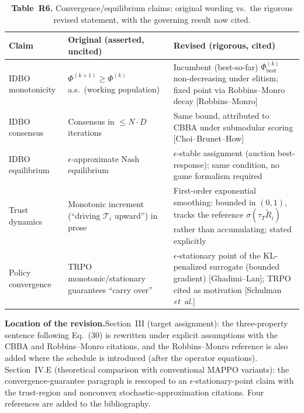 \documentclass[11pt]{article}
\newcommand{\loc}{\medskip\noindent\textbf{Location of the revision.}\quad}
\begin{document}
\begin{table}[h]
\centering
\caption*{\small\textbf{Table~R6.} Convergence/equilibrium claims: original wording vs.\ the
rigorous revised statement, with the governing result now cited.}
\renewcommand{\arraystretch}{1.3}
\footnotesize
\begin{tabular}{@{}p{} p{} p{}@{}}
\toprule
\textbf{Claim} & \textbf{Original (asserted, uncited)} & \textbf{Revised (rigorous, cited)}\\
\midrule
IDBO monotonicity & $\Phi^{(k+1)}\!\ge\!\Phi^{(k)}$ a.s.\ (working population) & Incumbent (best-so-far) $\Phi_{\mathrm{best}}^{(k)}$ non-decreasing under elitism; fixed point via Robbins--Monro decay [Robbins--Monro]\\
IDBO consensus & Consensus in $\le N\!\cdot\!D$ iterations & Same bound, attributed to CBBA under submodular scoring [Choi--Brunet--How]\\
IDBO equilibrium & $\epsilon$-approximate Nash equilibrium & $\epsilon$-stable assignment (auction best-response); same condition, no game formalism required\\
Trust dynamics & Monotonic increment (``driving $\mathcal{T}_i$ upward'') in prose & First-order exponential smoothing: bounded in $(0,1)$, tracks the reference $\sigma(\tau_T\tilde R_i)$ rather than accumulating; stated explicitly\\
Policy convergence & TRPO monotonic/stationary guarantees ``carry over'' & $\epsilon$-stationary point of the KL-penalized surrogate (bounded gradient) [Ghadimi--Lan]; TRPO cited as motivation [Schulman \emph{et~al.}]\\
\bottomrule
\end{tabular}
\end{table}

\loc Section~III (target assignment): the three-property sentence following Eq.~(30) is
rewritten under explicit assumptions with the CBBA and Robbins--Monro citations, and the
Robbins--Monro reference is also added where the schedule is introduced (after the operator
equations). Section~IV.E (theoretical comparison with conventional MAPPO variants): the
convergence-guarantee paragraph is rescoped to an $\epsilon$-stationary-point claim with the
trust-region and nonconvex stochastic-approximation citations. Four references are added to
the bibliography.

\clearpage
\end{document}

